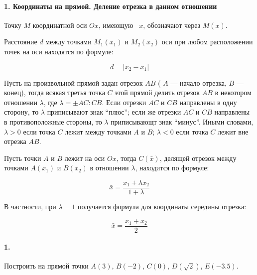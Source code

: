 \secdown


\paragraph{1. Координаты на прямой. Деление отрезка в данном отношении}

Точку $M$ координатной оси $Ox$, имеющую \ $x$, обозначают через
$M(x)$.

Расстояние $d$ между точками $M_{1}(x_{1})$ и $M_{2}(x_{2})$ оси при любом
расположении точек на оси находятся по формуле:

\begin{equation}
d=|x_{2}-x_{1}|
\end{equation}

Пусть на произвольной прямой задан отрезок $AB$ ( $A$ --- начало отрезка, $B$
--- конец), тогда всякая третья точка $C$ этой прямой делить отрезок $AB$ в
некотором отношении $\lambda$, где $\lambda= \pm AC:CB$. Если отрезки $AC$ и
$CB$ направлены в одну сторону, то $\lambda$ приписывают знак ``плюс''; если же
отрезки $AC$ и $CB$ направлены в противоположные стороны, то $\lambda$
приписывающт знак ``минус''. Иными словами, $\lambda>0$ если точка $C$ лежит
между точками $A$ и $B$; $\lambda < 0$ если точка $C$ лежит вне отрезка $AB$.

Пусть точки $A$ и $B$ лежит на оси $Ox$, тогда  $C(\bar{x})$, делящей отрезок между точками $A(x_1)$ и
$B(x_2)$ в отношении $\lambda$, находится по формуле:

\begin{equation}
\bar x=\frac{x_1+\lambda x_2}{1+\lambda}
\end{equation}

В частности, при $\lambda=1$ получается формула для координаты середины отрезка:

\begin{equation}
\bar x = \frac{x_1+x_2}{2}
\end{equation}

\paragraph{1.}

Построить на прямой точки $A(3)$, $B(-2)$, $C(0)$, $D(\sqrt{2})$, $E(-3.5)$. 

\secup



\secup